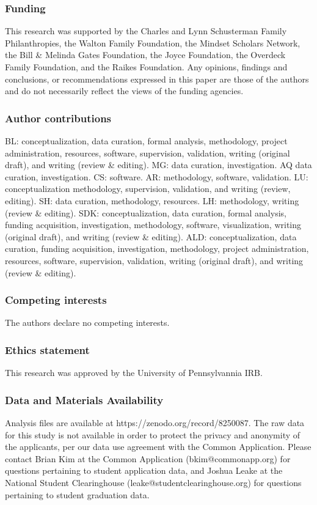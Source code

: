 \documentclass[11pt]{report}
\begin{document}
\begin{mainf}
\subsubsection{Funding} 

This research was supported by the Charles and Lynn Schusterman Family Philanthropies, the Walton Family Foundation, the Mindset Scholars Network, the Bill \& Melinda Gates Foundation, the Joyce Foundation, the Overdeck Family Foundation, and the Raikes Foundation. Any opinions, findings and conclusions, or recommendations expressed in this paper are those of the authors and do not necessarily reflect the views of the funding agencies. 


\subsubsection{Author contributions} 
BL: conceptualization, data curation, formal analysis, methodology, project administration, resources, software, supervision, validation, writing (original draft), and writing (review \& editing). MG: data curation, investigation. AQ data curation, investigation. CS: software. AR: methodology, software, validation. LU: conceptualization methodology, supervision, validation, and writing (review, editing). SH: data curation, methodology, resources. LH: methodology, writing (review \& editing). SDK: conceptualization, data curation, formal analysis, funding acquisition, investigation, methodology,  software, visualization, writing (original draft), and writing (review \& editing). ALD: conceptualization, data curation, funding acquisition, investigation, methodology, project administration, resources, software, supervision, validation, writing (original draft), and writing (review \& editing). 

\subsubsection{Competing interests} 
The authors declare no competing interests. 

\subsubsection{Ethics statement} 
This research was approved by the University of Pennsylvannia IRB. 

\subsubsection{Data and Materials Availability} 
Analysis files are available at https://zenodo.org/record/8250087. The raw data for this study is not available in order to protect the privacy and anonymity of the applicants, per our data use agreement with the Common Application. Please contact Brian Kim at the Common Application (bkim@commonapp.org) for questions pertaining to student application data, and Joshua Leake at the National Student Clearinghouse (leake@studentclearinghouse.org) for questions pertaining to student graduation data.


\end{mainf}
\end{document}

